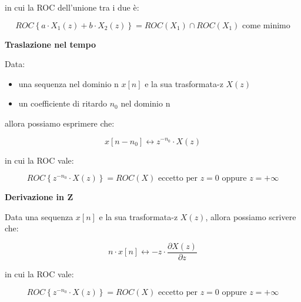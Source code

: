 in cui la ROC dell'unione tra i due è: 

{
    \Large 
    \begin{equation}
        ROC \left\{ 
        a \cdot X_1 \left( z\right)
        + 
        b \cdot X_2 \left( z\right)
        \right\}
        = 
        ROC \left( X_1\right) 
        \cap
        ROC \left( X_1\right) \text{ come minimo} 
    \end{equation}
}

\textbf{Traslazione nel tempo} \newline 

Data: 

\begin{itemize}
    \item una sequenza nel dominio n $x \left[ n\right]$ e la sua trasformata-z $X \left(z\right)$
    \item un coefficiente di ritardo $n_0$ nel dominio n
\end{itemize}

allora possiamo esprimere che: 

{
    \Large 
    \begin{equation}
        x \left[ n - n_0\right] 
        \leftrightarrow
        z^{- n_0} \cdot X \left( z\right)
    \end{equation}
}

in cui la ROC vale: 

{
    \Large 
    \begin{equation}
        ROC \left\{ z^{- n_0} \cdot X \left( z\right) \right\}
        = 
        ROC \left( X \right) 
        \text{ eccetto per } z = 0 \text{ oppure } z = + \infty
    \end{equation}
} 

\newpage 

\textbf{Derivazione in Z} \newline 

Data una sequenza $x \left[ n\right]$ e la sua trasformata-z $X \left(z\right)$, 
allora possiamo scrivere che: 

{
    \Large 
    \begin{equation}
        n \cdot x \left[ n\right]
        \leftrightarrow 
        - z \cdot \dfrac{\partial X \left( z\right)}{\partial z}
    \end{equation}
}

in cui la ROC vale: 

{
    \Large 
    \begin{equation}
        ROC \left\{ z^{- n_0} \cdot X \left( z\right) \right\}
        = 
        ROC \left( X \right) 
        \text{ eccetto per } z = 0 \text{ oppure } z = + \infty
    \end{equation}
} 

